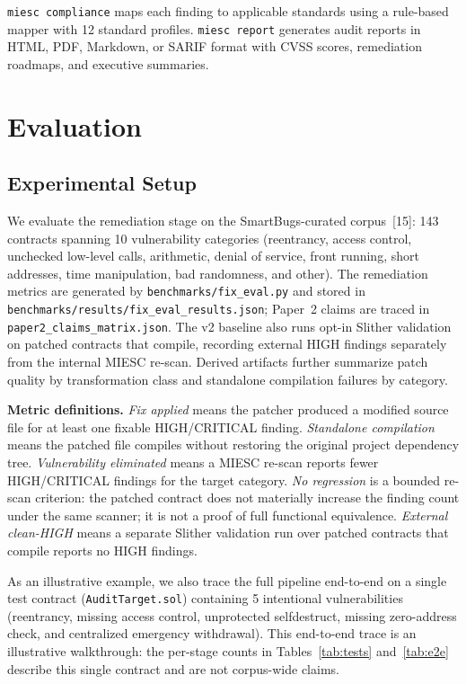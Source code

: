 \documentclass[conference]{IEEEtran}
\begin{document}
\texttt{miesc compliance} maps each finding to applicable standards using a rule-based mapper with 12 standard profiles. \texttt{miesc report} generates audit reports in HTML, PDF, Markdown, or SARIF format with CVSS scores, remediation roadmaps, and executive summaries.

\section{Evaluation}

\subsection{Experimental Setup}

We evaluate the remediation stage on the SmartBugs-curated corpus~[15]: 143 contracts spanning 10 vulnerability categories (reentrancy, access control, unchecked low-level calls, arithmetic, denial of service, front running, short addresses, time manipulation, bad randomness, and other). The remediation metrics are generated by \texttt{benchmarks/fix\_eval.py} and stored in \texttt{benchmarks/results/fix\_eval\_results.json}; Paper~2 claims are traced in \texttt{paper2\_claims\_matrix.json}. The v2 baseline also runs opt-in Slither validation on patched contracts that compile, recording external HIGH findings separately from the internal MIESC re-scan. Derived artifacts further summarize patch quality by transformation class and standalone compilation failures by category.

\textbf{Metric definitions.} \emph{Fix applied} means the patcher produced a modified source file for at least one fixable HIGH/CRITICAL finding. \emph{Standalone compilation} means the patched file compiles without restoring the original project dependency tree. \emph{Vulnerability eliminated} means a MIESC re-scan reports fewer HIGH/CRITICAL findings for the target category. \emph{No regression} is a bounded re-scan criterion: the patched contract does not materially increase the finding count under the same scanner; it is not a proof of full functional equivalence. \emph{External clean-HIGH} means a separate Slither validation run over patched contracts that compile reports no HIGH findings.

As an illustrative example, we also trace the full pipeline end-to-end on a single test contract (\texttt{AuditTarget.sol}) containing 5 intentional vulnerabilities (reentrancy, missing access control, unprotected selfdestruct, missing zero-address check, and centralized emergency withdrawal). This end-to-end trace is an illustrative walkthrough: the per-stage counts in Tables~\ref{tab:tests} and~\ref{tab:e2e} describe this single contract and are not corpus-wide claims.
\end{document}
